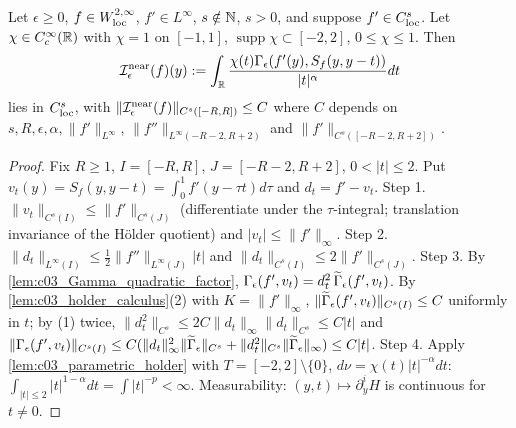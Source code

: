\begin{lemma}
  \label{lem:c03_I_near}
  Let $\epsilon\ge0$, $f\in W^{2,\infty}_{\textup{loc}}$, $f'\in L^\infty$, $s\notin\mathbb{N}$, $s>0$, and suppose $f'\in C^s_{\textup{loc}}$.
  Let $\chi\in C_c^\infty(\mathbb{R})$ with $\chi=1$ on $[-1,1]$, $\operatorname{supp}\chi\subset[-2,2]$, $0\le\chi\le1$. Then
  \[
    \mathcal{I}^{\textup{near}}_\epsilon(f)(y):=\int_{\mathbb{R}}\frac{\chi(t)\Gamma_\epsilon(f'(y),S_f(y,y-t))}{|t|^\alpha}dt
  \]
  lies in $C^s_{\textup{loc}}$, with $\|\mathcal{I}^{\textup{near}}_\epsilon(f)\|_{C^s([-R,R])}\le C$ where $C$ depends on $s,R,\epsilon,\alpha,\|f'\|_{L^\infty}$, $\|f''\|_{L^\infty(-R-2,R+2)}$ and $\|f'\|_{C^s([-R-2,R+2])}$.
\end{lemma}
\begin{proof}
  Fix $R\ge1$, $I=[-R,R]$, $J=[-R-2,R+2]$, $0<|t|\le2$. Put $v_t(y)=S_f(y,y-t)=\int_0^1f'(y-\tau t)d\tau$ and $d_t=f'-v_t$.
  Step 1. $\|v_t\|_{C^s(I)}\le\|f'\|_{C^s(J)}$ (differentiate under the $\tau$-integral; translation invariance of the H\"older quotient) and $|v_t|\le\|f'\|_\infty$.
  Step 2. $\|d_t\|_{L^\infty(I)}\le\frac12\|f''\|_{L^\infty(J)}|t|$ and $\|d_t\|_{C^s(I)}\le2\|f'\|_{C^s(J)}$.
  Step 3. By \cref{lem:c03_Gamma_quadratic_factor}, $\Gamma_\epsilon(f',v_t)=d_t^2\,\widetilde{\Gamma}_\epsilon(f',v_t)$. By \cref{lem:c03_holder_calculus}(2) with $K=\|f'\|_\infty$, $\|\widetilde{\Gamma}_\epsilon(f',v_t)\|_{C^s(I)}\le C$ uniformly in $t$; by (1) twice,
  $\|d_t^2\|_{C^s}\le 2C\|d_t\|_\infty\|d_t\|_{C^s}\le C|t|$ and
  $\|\Gamma_\epsilon(f',v_t)\|_{C^s(I)}\le C(\|d_t\|_\infty^2\|\widetilde{\Gamma}_\epsilon\|_{C^s}+\|d_t^2\|_{C^s}\|\widetilde{\Gamma}_\epsilon\|_\infty)\le C|t|$.
  Step 4. Apply \cref{lem:c03_parametric_holder} with $T=[-2,2]\setminus\{0\}$, $d\nu=\chi(t)|t|^{-\alpha}dt$: $\int_{|t|\le2}|t|^{1-\alpha}dt=\int|t|^{-p}<\infty$. Measurability: $(y,t)\mapsto\partial_y^iH$ is continuous for $t\ne0$.
\end{proof}

